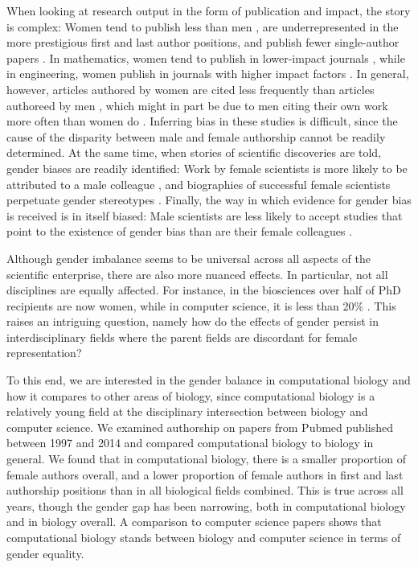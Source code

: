 \documentclass[10pt,letterpaper]{article}
\begin{document}
\begin{flushleft}
When looking at research output in the form of publication and impact, the story is complex: Women tend to publish less than men \cite{Lariviere2013}, are underrepresented in the more prestigious first and last author positions, and publish fewer single-author papers \cite{West2013}. In mathematics, women tend to publish in lower-impact journals \cite{Mihaljevic-Brandt2016}, while in engineering, women publish in journals with higher impact factors \cite{Ghiasi2015}. In general, however, articles authored by women are cited less frequently than articles authoreed by men \cite{Lariviere2013,Ghiasi2016}, which might in part be due to men citing their own work more often than women do \cite{King2016}. Inferring bias in these studies is difficult, since the cause of the disparity between male and female authorship cannot be readily determined. At the same time, when stories of scientific discoveries are told, gender biases are readily identified: Work by female scientists is more likely to be attributed to a male colleague \cite{Rossiter1993}, and biographies of successful female scientists perpetuate gender stereotypes \cite{Fara2013}. Finally, the way in which evidence for gender bias is received is in itself biased:  Male scientists are less likely to accept studies that point to the existence of gender bias than are their female colleagues \cite{Handley2015}.

Although gender imbalance seems to be universal across all aspects of the scientific enterprise, there are also more nuanced effects. In particular, not all disciplines are equally affected. For instance, in the biosciences over half of PhD recipients are now women, while in computer science, it is less than 20\% \cite{NSF2015}. This raises an intriguing question, namely how do the effects of gender persist in interdisciplinary fields where the parent fields are discordant for female representation?

To this end, we are interested in the gender balance in computational biology and how it compares to other areas of biology, since computational biology is a relatively young field at the disciplinary intersection between biology and computer science. We examined authorship on papers from Pubmed published between 1997 and 2014 and compared computational biology to biology in general. We found that in computational biology, there is a smaller proportion of female authors overall, and a lower proportion of female authors in first and last authorship positions than in all biological fields combined. This is true across all years, though the gender gap has been narrowing, both in computational biology and in biology overall. A comparison to computer science papers shows that computational biology stands between biology and computer science in terms of gender equality.


\end{flushleft}
\end{document}
